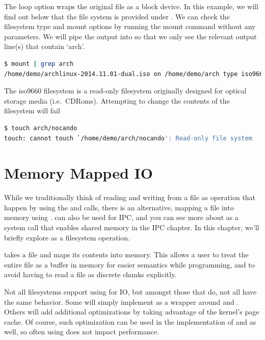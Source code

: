 The loop option wraps the original file as a block device.
In this example, we will find out below that the file system is provided under .
We can check the filesystem type and mount options by running the mount command without any parameters.
We will pipe the output into  so that we only see the relevant output line(s) that contain `arch'.

\begin{lstlisting}[language=bash]
$ mount | grep arch
/home/demo/archlinux-2014.11.01-dual.iso on /home/demo/arch type iso9660 (rw,loop=/dev/loop0)
\end{lstlisting}

The iso9660 filesystem is a read-only filesystem originally designed for optical storage media (i.e.~CDRoms).
Attempting to change the contents of the filesystem will fail

\begin{lstlisting}[language=bash]
$ touch arch/nocando
touch: cannot touch `/home/demo/arch/nocando': Read-only file system
\end{lstlisting}

\section{Memory Mapped IO}

While we traditionally think of reading and writing from a file as operation that happen by using the  and  calls, there is an alternative, mapping a file into memory using .
 can also be used for IPC, and you can see more about  as a system call that enables shared memory in the IPC chapter.
In this chapter, we'll briefly explore  as a filesystem operation.

 takes a file and maps its contents into memory.
This allows a user to treat the entire file as a buffer in memory for easier semantics while programming, and to avoid having to read a file as discrete chunks explicitly.

Not all filesystems support using  for IO, but amongst those that do, not all have the same behavior.
Some will simply implement  as a wrapper around  and .
Others will add additional optimizations by taking advantage of the kernel's page cache.
Of course, such optimization can be used in the implementation of  and  as well, so often using  does not impact performance.

